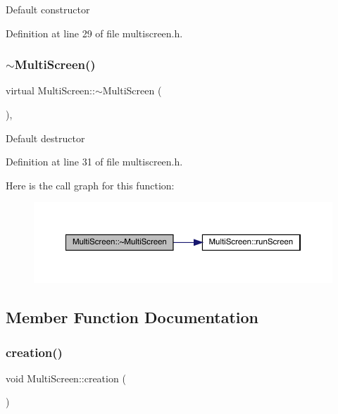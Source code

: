 Default constructor 

Definition at line 29 of file multiscreen.\+h.

\mbox{\label{class_multi_screen_a1b57e27d1b490cd40fd67cf4aca01f2c}} 
\subsubsection{\texorpdfstring{$\sim$\+Multi\+Screen()}{~MultiScreen()}}
{\footnotesize\ttfamily virtual Multi\+Screen\+::$\sim$\+Multi\+Screen (\begin{DoxyParamCaption}{ }\end{DoxyParamCaption})\hspace{0.3cm}{\ttfamily [inline]}, {\ttfamily [virtual]}}

Default destructor 

Definition at line 31 of file multiscreen.\+h.

Here is the call graph for this function\+:\nopagebreak
\begin{figure}[H]
\begin{center}
\leavevmode
\includegraphics[width=350pt]{class_multi_screen_a1b57e27d1b490cd40fd67cf4aca01f2c_cgraph}
\end{center}
\end{figure}


\subsection{Member Function Documentation}
\mbox{\label{class_multi_screen_a543c3d0f0c8f9346bf5c9e3fb1eb8c99}} 
\subsubsection{\texorpdfstring{creation()}{creation()}}
{\footnotesize\ttfamily void Multi\+Screen\+::creation (\begin{DoxyParamCaption}{ }\end{DoxyParamCaption})\hspace{0.3cm}{\ttfamily [inline]}}



